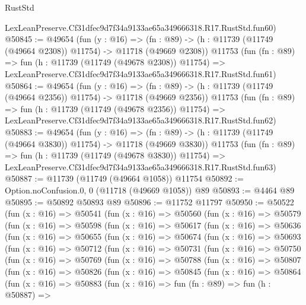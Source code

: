 \begin{lexlean}{RustStd}
\begin{coremodule}
    LexLeanPreserve.Cf31dfec9d7f34a9133ae65a349666318.R17.RustStd.fun60)
@50845 := @49654
    (fun (y : @16) =>
    (fn : @89) -> (h : @11739 (@11749 (@49664 @2308)) @11754) -> @11718 (@49669 @2308))
    @11753
    (fun (fn : @89) =>
    fun (h : @11739 (@11749 (@49678 @2308)) @11754) =>
    LexLeanPreserve.Cf31dfec9d7f34a9133ae65a349666318.R17.RustStd.fun61)
@50864 := @49654
    (fun (y : @16) =>
    (fn : @89) -> (h : @11739 (@11749 (@49664 @2356)) @11754) -> @11718 (@49669 @2356))
    @11753
    (fun (fn : @89) =>
    fun (h : @11739 (@11749 (@49678 @2356)) @11754) =>
    LexLeanPreserve.Cf31dfec9d7f34a9133ae65a349666318.R17.RustStd.fun62)
@50883 := @49654
    (fun (y : @16) =>
    (fn : @89) -> (h : @11739 (@11749 (@49664 @3830)) @11754) -> @11718 (@49669 @3830))
    @11753
    (fun (fn : @89) =>
    fun (h : @11739 (@11749 (@49678 @3830)) @11754) =>
    LexLeanPreserve.Cf31dfec9d7f34a9133ae65a349666318.R17.RustStd.fun63)
@50887 := @11739 (@11749 (@49664 @1058)) @11754
@50892 := Option.noConfusion.{0, 0} (@11718 (@49669 @1058)) @89
@50893 := @4464 @89
@50895 := @50892 @50893 @89
@50896 := @11752 @11797
@50950 := @50522
    (fun (x : @16) =>
    @50541
      (fun (x : @16) =>
      @50560
        (fun (x : @16) =>
        @50579
          (fun (x : @16) =>
          @50598
            (fun (x : @16) =>
            @50617
              (fun (x : @16) =>
              @50636
                (fun (x : @16) =>
                @50655
                  (fun (x : @16) =>
                  @50674
                    (fun (x : @16) =>
                    @50693
                      (fun (x : @16) =>
                      @50712
                        (fun (x : @16) =>
                        @50731
                          (fun (x : @16) =>
                          @50750
                            (fun (x : @16) =>
                            @50769
                              (fun (x : @16) =>
                              @50788
                                (fun (x : @16) =>
                                @50807
                                  (fun (x : @16) =>
                                  @50826
                                    (fun (x : @16) =>
                                    @50845
                                      (fun (x : @16) =>
                                      @50864
                                        (fun (x : @16) =>
                                        @50883
                                          (fun (x : @16) =>
                                          fun (fn : @89) =>
                                          fun (h : @50887) =>

\end{coremodule}
\end{lexlean}
